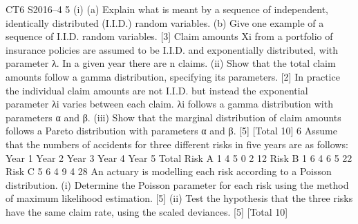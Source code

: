 \documentclass[a4paper,12pt]{article}
\begin{document}
 
CT6 S2016–4
5 (i) (a) Explain what is meant by a sequence of independent, identically
distributed (I.I.D.) random variables.
(b) Give one example of a sequence of I.I.D. random variables.
[3]
Claim amounts Xi from a portfolio of insurance policies are assumed to be I.I.D. and
exponentially distributed, with parameter λ. In a given year there are n claims.
(ii) Show that the total claim amounts follow a gamma distribution, specifying its parameters. [2]
In practice the individual claim amounts are not I.I.D. but instead the exponential parameter λi varies between each claim. λi follows a gamma distribution with parameters α and β.
(iii) Show that the marginal distribution of claim amounts follows a Pareto distribution with parameters α and β. [5]
[Total 10]
6 Assume that the numbers of accidents for three different risks in five years are as
follows:
  Year 1 Year 2 Year 3 Year 4 Year 5 Total
Risk A 1 4 5 0 2 12
Risk B 1 6 4 6 5 22
Risk C 5 6 4 9 4 28
An actuary is modelling each risk according to a Poisson distribution.
(i) Determine the Poisson parameter for each risk using the method of maximum likelihood estimation. [5]
(ii) Test the hypothesis that the three risks have the same claim rate, using the
scaled deviances. [5]
[Total 10]
\end{document}
